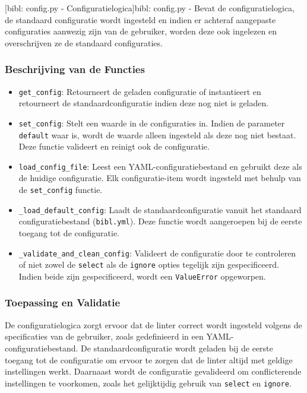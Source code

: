 [bibl: config.py - Configuratielogica]{bibl: config.py - Bevat de configuratielogica, de standaard configuratie wordt ingesteld en indien er achteraf aangepaste configuraties aanwezig zijn van de gebruiker, worden deze ook ingelezen en overschrijven ze de standaard configuraties. \label{lst:bibl_cli_command}}
\subsubsection{Beschrijving van de Functies}

\begin{itemize}
    \item \texttt{get\_config}: Retourneert de geladen configuratie of instantieert en retourneert de standaardconfiguratie indien deze nog niet is geladen.
    \item \texttt{set\_config}: Stelt een waarde in de configuraties in. Indien de parameter \texttt{default} waar is, wordt de waarde alleen ingesteld als deze nog niet bestaat. Deze functie valideert en reinigt ook de configuratie.
    \item \texttt{load\_config\_file}: Leest een YAML-configuratiebestand en gebruikt deze als de huidige configuratie. Elk configuratie-item wordt ingesteld met behulp van de \texttt{set\_config} functie.
    \item \texttt{\_load\_default\_config}: Laadt de standaardconfiguratie vanuit het standaard configuratiebestand (\texttt{bibl.yml}). Deze functie wordt aangeroepen bij de eerste toegang tot de configuratie.
    \item \texttt{\_validate\_and\_clean\_config}: Valideert de configuratie door te controleren of niet zowel de \texttt{select} als de \texttt{ignore} opties tegelijk zijn gespecificeerd. Indien beide zijn gespecificeerd, wordt een \texttt{ValueError} opgeworpen.
\end{itemize}

\subsubsection{Toepassing en Validatie}

De configuratielogica zorgt ervoor dat de linter correct wordt ingesteld volgens de specificaties van de gebruiker, zoals gedefinieerd in een YAML-configuratiebestand. De standaardconfiguratie wordt geladen bij de eerste toegang tot de configuratie om ervoor te zorgen dat de linter altijd met geldige instellingen werkt. Daarnaast wordt de configuratie gevalideerd om conflicterende instellingen te voorkomen, zoals het gelijktijdig gebruik van \texttt{select} en \texttt{ignore}.

